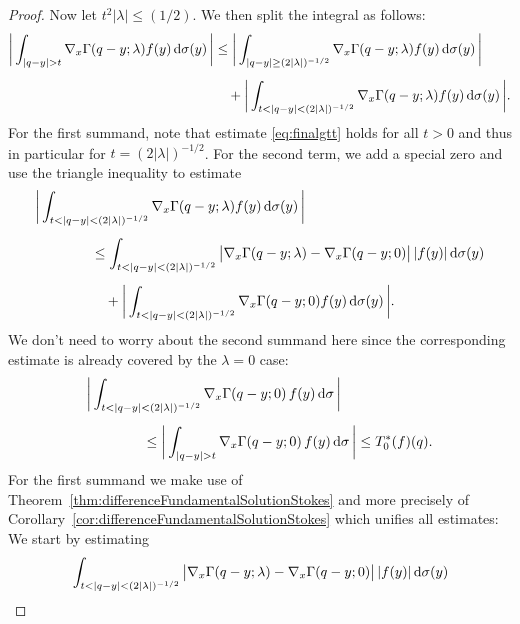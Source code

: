 \begin{proof}
  Now let $t^2 |\lambda| \leq ({1}/{2})$.
  We then split the integral as follows:
  \begin{align*}
    \bigg| \int_{|q - y| > t} \nabla_x \Gamma(q - y; \lambda) f(y) \, {\operatorname{d}\!{\sigma}}(y) \, \bigg| 
    &\leq \bigg| \int_{|q -y | \geq (2|\lambda|)^{-1/2}} \nabla_x\Gamma(q - y; \lambda)f(y) \, {\operatorname{d}\!{\sigma}}(y)\, \bigg| \\[0.5em]
     &\quad + \bigg| \int_{t < |q - y| < (2|\lambda|)^{-1/2}} \nabla_x\Gamma(q - y; \lambda)f(y) \, {\operatorname{d}\!{\sigma}}(y)\, \bigg|.
  \end{align*}
  For the first summand, note that estimate \eqref{eq:finalgtt} holds for all $t > 0$ and thus in particular for  $t = (2|\lambda|)^{-1/2}$.
  For the second term, we add a special zero and use the triangle inequality to estimate
  \begin{align*}
    &\bigg| \int_{t < |q - y| < (2|\lambda|)^{-1/2}} \nabla_x\Gamma(q - y; \lambda)f(y) \, {\operatorname{d}\!{\sigma}}(y) \,\bigg| \\[0.5em]
    &\qquad\qquad\leq \int_{t < |q - y| < (2|\lambda|)^{-1/2}} \big|\nabla_x\Gamma(q - y; \lambda) - \nabla_x\Gamma(q - y; 0) \big| \, |f(y)| \, {\operatorname{d}\!{\sigma}}(y) \\[0.5em]
     &\qquad\qquad\quad + \bigg| \int_{t < |q - y| < (2|\lambda|)^{-1/2}} \nabla_x\Gamma(q - y; 0) f(y)  \, {\operatorname{d}\!{\sigma}}(y)\, \bigg|.
  \end{align*}
  We don't need to worry about the second summand here since the corresponding estimate is already covered by the $\lambda = 0$ case:
  \begin{align}
    \label{eq:lambda0case}
    \begin{alignedat}{1}
      &\bigg| \int_{t < |q - y| < (2|\lambda|)^{-1/2}} \nabla_x\Gamma(q - y; 0) \, f(y)  \, {\operatorname{d}\!{\sigma}}\, \bigg| \\[0.5em]
      &\qquad\qquad \leq \bigg| \int_{|q - y| > t} \nabla_x\Gamma(q - y; 0) \, f(y)  \, {\operatorname{d}\!{\sigma}} \,\bigg| 
     \leq T_0^*(f)(q).
    \end{alignedat}
   \end{align}
   For the first summand we make use of Theorem~\ref{thm:differenceFundamentalSolutionStokes} and more precisely of Corollary~\ref{cor:differenceFundamentalSolutionStokes} which unifies all estimates: We start by estimating
   \begin{align}
     \label{eq:estDiff}
     \begin{alignedat}{1}
       &\int_{t < |q - y| < (2|\lambda|)^{-1/2}} \big|\nabla_x\Gamma(q - y; \lambda) - \nabla_x\Gamma(q - y; 0) \big| \, |f(y)| \d\sigma(y) \\

\end{alignedat}
\end{align}
\end{proof}

